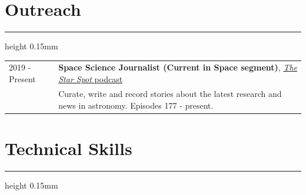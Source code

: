 \documentclass[10pt]{article}
\begin{document}

\vspace{-2mm}
\section*{Outreach}
\vspace{-1.5mm}
\hrule height 0.15mm
\vspace{2mm}

\begin{tabularx}{\textwidth}{lX}
    2019 - Present & \textbf{Space Science Journalist (Current in Space segment)}, \href{https://thestarspot.ca/}{\textit{The Star Spot} podcast} \\
                   & Curate, write and record stories about the latest research and news in astronomy. Episodes 177 - present.
\end{tabularx}

\vspace{-2mm}
\section*{Technical Skills}
\vspace{-1.5mm}
\hrule height 0.15mm
\vspace{2mm}
\end{document}
